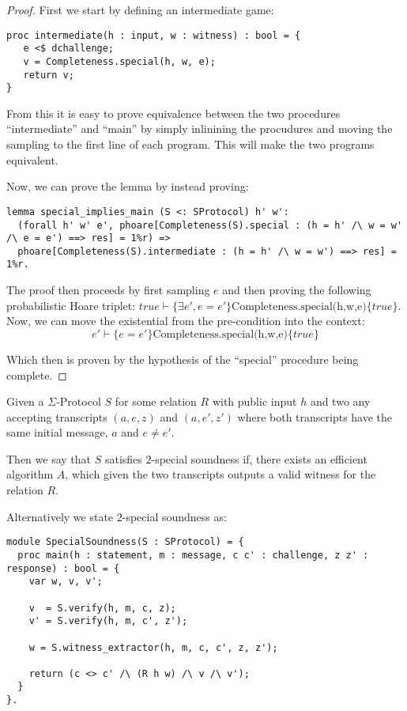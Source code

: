\begin{proof}
First we start by defining an intermediate game:
\begin{lstlisting}
proc intermediate(h : input, w : witness) : bool = {
   e <$ dchallenge;
   v = Completeness.special(h, w, e);
   return v;
}
\end{lstlisting}

From this it is easy to prove equivalence between the two procedures
``intermediate'' and ``main'' by simply inlinining the procudures and moving
the sampling to the first line of each program. This will make the two programs
equivalent.

Now, we can prove the lemma by instead proving:
\begin{lstlisting}
lemma special_implies_main (S <: SProtocol) h' w':
  (forall h' w' e', phoare[Completeness(S).special : (h = h' /\ w = w' /\ e = e') ==> res] = 1%r) =>
  phoare[Completeness(S).intermediate : (h = h' /\ w = w') ==> res] = 1%r.
\end{lstlisting}

The proof then proceeds by first sampling $e$ and then proving the following
probabilistic Hoare triplet: $true \vdash \{\exists e', e = e'\}
\text{Completeness.special(h,w,e)} \{true\}$. Now, we can move the existential
from the pre-condition into the context:
\[
  e' \vdash \{e = e'\} \text{Completeness.special(h,w,e)} \{true\}
\]

Which then is proven by the hypothesis of the ``special'' procedure being complete.

\end{proof}


\begin{definition}
Given a $\Sigma$-Protocol $S$ for some relation $R$ with public input $h$
and two any accepting transcripts $(a,e,z)$ and $(a,e',z')$
where both transcripts have the same initial message, $a$ and $e \neq e'$.

Then we say that $S$ satisfies $2$-special soundness if, there exists an
efficient  algorithm $A$,
which given the two transcripts outputs a valid witness for the relation $R$.

Alternatively we state $2$-special soundness as:
\begin{lstlisting}
module SpecialSoundness(S : SProtocol) = {
  proc main(h : statement, m : message, c c' : challenge, z z' : response) : bool = {
    var w, v, v';

    v  = S.verify(h, m, c, z);
    v' = S.verify(h, m, c', z');

    w = S.witness_extractor(h, m, c, c', z, z');

    return (c <> c' /\ (R h w) /\ v /\ v');
  }
}.
\end{lstlisting}


\end{definition}

